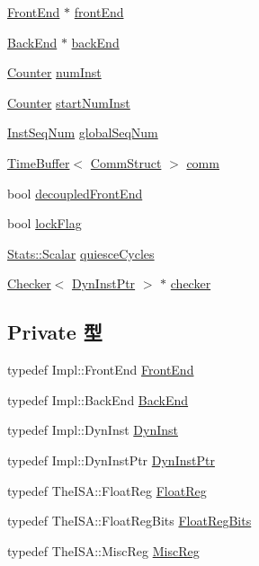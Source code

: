 \begin{DoxyCompactItemize}
\hyperlink{classFrontEnd}{FrontEnd} $\ast$ \hyperlink{classOzoneCPU_a67c762418bb2017cb2dce5a0c94f0788}{frontEnd}
\item 
\hyperlink{classBackEnd}{BackEnd} $\ast$ \hyperlink{classOzoneCPU_af59b0af2f4e41305c729ac6e36fd7803}{backEnd}
\item 
\hyperlink{base_2types_8hh_ae1475755791765b8e6f6a8bb091e273e}{Counter} \hyperlink{classOzoneCPU_a1431f3f73435dd9b1c68e7e3a303ada0}{numInst}
\item 
\hyperlink{base_2types_8hh_ae1475755791765b8e6f6a8bb091e273e}{Counter} \hyperlink{classOzoneCPU_add074e8bdc5b62781b8ef02d666dc6b1}{startNumInst}
\item 
\hyperlink{inst__seq_8hh_a258d93d98edaedee089435c19ea2ea2e}{InstSeqNum} \hyperlink{classOzoneCPU_a5f72a799d8b189b4fccda3cde457145e}{globalSeqNum}
\item 
\hyperlink{classTimeBuffer}{TimeBuffer}$<$ \hyperlink{structOzoneCPU_1_1CommStruct}{CommStruct} $>$ \hyperlink{classOzoneCPU_a56544a9a5a169c4823c2adbb5e1d9e93}{comm}
\item 
bool \hyperlink{classOzoneCPU_a58989cf25fa8791be696b307e8ee430d}{decoupledFrontEnd}
\item 
bool \hyperlink{classOzoneCPU_aa062c7f3423632ca66107fdbb9d38131}{lockFlag}
\item 
\hyperlink{classStats_1_1Scalar}{Stats::Scalar} \hyperlink{classOzoneCPU_abb746a633705067014bd46e175928a51}{quiesceCycles}
\item 
\hyperlink{classChecker}{Checker}$<$ \hyperlink{classOzoneCPU_a028ce10889c5f6450239d9e9a7347976}{DynInstPtr} $>$ $\ast$ \hyperlink{classOzoneCPU_af07b45c0b87d6672f4066d2c189013f9}{checker}
\end{DoxyCompactItemize}
\subsection*{Private 型}
\begin{DoxyCompactItemize}
\item 
typedef Impl::FrontEnd \hyperlink{classOzoneCPU_abe8e1d8243582d5024a1076f6091d9fe}{FrontEnd}
\item 
typedef Impl::BackEnd \hyperlink{classOzoneCPU_a3de526baa0cbb2b55bf669a6f7bf81cc}{BackEnd}
\item 
typedef Impl::DynInst \hyperlink{classOzoneCPU_ab741745c86a14c765b999c11167636d9}{DynInst}
\item 
typedef Impl::DynInstPtr \hyperlink{classOzoneCPU_a028ce10889c5f6450239d9e9a7347976}{DynInstPtr}
\item 
typedef TheISA::FloatReg \hyperlink{classOzoneCPU_a75484259f1855aabc8d74c6eb1cfe186}{FloatReg}
\item 
typedef TheISA::FloatRegBits \hyperlink{classOzoneCPU_aab5eeae86499f9bfe15ef79360eccc64}{FloatRegBits}
\item 
typedef TheISA::MiscReg \hyperlink{classOzoneCPU_aaf5f073a387db0556d1db4bcc45428bc}{MiscReg}
\end{DoxyCompactItemize}
